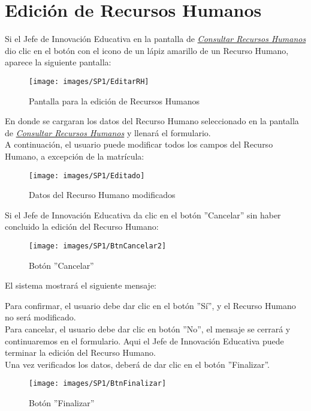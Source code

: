 \newpage
\section{Edición de Recursos Humanos}
Si el Jefe de Innovación Educativa en la pantalla de \hyperlink{consultarrh}{\textit{Consultar Recursos Humanos}} dio clic en el botón con el icono de un lápiz amarillo de un Recurso Humano, aparece la siguiente pantalla:

\begin{figure}[!hbtp]
	\centering
	\hypertarget{editarrh}{\texttt{[image: images/SP1/EditarRH]}}
	\caption{Pantalla para la edición de Recursos Humanos}
	\label{editarrh}
\end{figure}

En donde se cargaran los datos del Recurso Humano seleccionado en la pantalla de \hyperlink{consultarrh}{\textit{Consultar Recursos Humanos}} y llenará el formulario.\\

A continuación, el usuario puede modificar todos los campos del Recurso Humano, a excepción de la matrícula:
\begin{figure}[!hbtp]
	\centering
	\hypertarget{modif}{\texttt{[image: images/SP1/Editado]}}
	\caption{Datos del Recurso Humano modificados}
	\label{modif}
\end{figure}

Si el Jefe de Innovación Educativa da clic en el botón ''Cancelar'' sin haber concluido la edición del Recurso Humano:

\begin{figure}[!hbtp]
	\centering
	\hypertarget{cancel2}{\texttt{[image: images/SP1/BtnCancelar2]}}
	\caption{Botón ''Cancelar''}
	\label{cancel2}
\end{figure}

El sistema mostrará el siguiente mensaje:

Para confirmar, el usuario debe dar clic en el botón ''Sí'', y el Recurso Humano no será modificado.\\

Para cancelar, el usuario debe dar clic en botón ''No'', el mensaje se cerrará y continuaremos en el formulario. Aqui el Jefe de Innovación Educativa puede terminar la edición del Recurso Humano.\\

Una vez verificados los datos, deberá de dar clic en el botón ''Finalizar''.
\begin{figure}[!hbtp]
	\centering
	\hypertarget{btnfin}{\texttt{[image: images/SP1/BtnFinalizar]}}
	\caption{Botón ''Finalizar''}
	\label{btnfin}
\end{figure}

